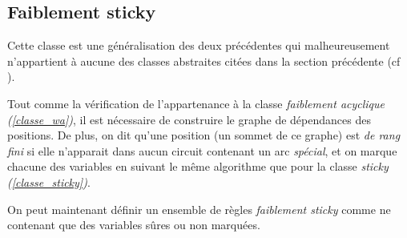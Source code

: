 \subsection{Faiblement sticky}\label{classe_ws}
Cette classe est une généralisation des deux précédentes qui malheureusement n'appartient
à aucune des classes abstraites citées dans la section précédente (cf \cite{nonguarded}).

Tout comme la vérification de l'appartenance à la classe {\em faiblement acyclique
(\ref{classe_wa})}, il est nécessaire de construire le graphe de dépendances des
positions. De plus, on dit qu'une position (un sommet de ce graphe) est {\em de rang fini} si
elle n'apparait dans aucun circuit contenant un arc {\em spécial}, et on marque chacune
des variables en suivant le même algorithme que pour la classe {\em sticky
(\ref{classe_sticky})}.

On peut maintenant définir un ensemble de règles {\em faiblement sticky} comme ne
contenant que des variables sûres ou non marquées.


